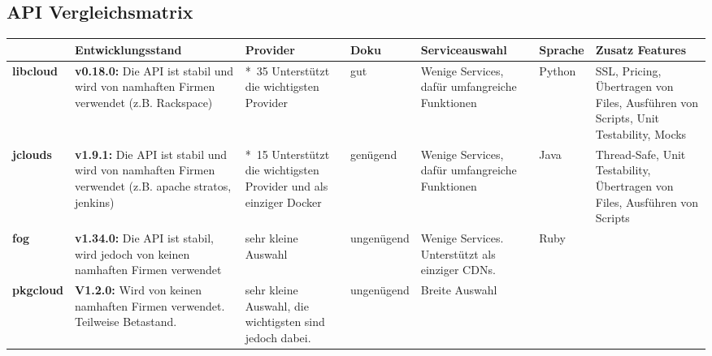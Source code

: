 
\begin{landscape}
  \subsection{API Vergleichsmatrix}
  \label{API Vergleichsmatrix}
\begin{table}[h]  
  \begin{tabularx}{\linewidth}{|l|X|X|l|X|l|X|}
    \hline
    &
    \textbf{Entwicklungsstand}
    &
    \textbf{Provider}
    &
    \textbf{Doku}
    &
    \textbf{Serviceauswahl}
    &
    \textbf{Sprache}
    &
    \textbf{Zusatz Features}
   \\
  \hline
  \textbf{libcloud} & \cellcolor{green!25} \textbf{v0.18.0:} 
  Die API ist stabil und wird von namhaften Firmen verwendet 
  (z.B. Rackspace)
  & 
  \cellcolor{green!25}
  *~35 Unterstützt die wichtigsten Provider
  & 
   \cellcolor{green!25}
   gut
  & 
   \cellcolor{green!25}
  Wenige Services, dafür umfangreiche Funktionen
  & 
     \cellcolor{yellow!25}
  Python
  & 
  \cellcolor{green!25}
  SSL, Pricing, Übertragen von Files, Ausführen von Scripts, Unit Testability, Mocks
  \\
  \hline
 \textbf{jclouds}
& 
\cellcolor{green!25} 
\textbf{v1.9.1:} Die API ist stabil und wird von namhaften 
Firmen verwendet (z.B. apache stratos, jenkins)
&	
\cellcolor{green!25}
*~15
Unterstützt die wichtigsten Provider und als einziger Docker
&
\cellcolor{yellow!25}
genügend
&
\cellcolor{green!25}
Wenige Services, dafür umfangreiche Funktionen	
&
\cellcolor{green!25}
Java	
&
\cellcolor{green!25}
Thread-Safe, Unit Testability, Übertragen von Files, Ausführen von Scripts
 \\
 \hline
 \textbf{fog}
 &
 \cellcolor{yellow!25}	
 \textbf{v1.34.0:} 
 Die API ist stabil, wird jedoch von keinen namhaften Firmen verwendet
 &
 \cellcolor{red!50}
 sehr kleine Auswahl
 &
  \cellcolor{red!50}	
ungenügend	
&
 \cellcolor{red!50}
Wenige Services. Unterstützt als einziger CDNs.	
&
 \cellcolor{red!50}
Ruby
&
 \cellcolor{red!50}
\\
\hline
\textbf{pkgcloud}
&
 \cellcolor{yellow!25}	
\textbf{V1.2.0:} Wird von keinen namhaften Firmen verwendet. Teilweise Betastand.
&
\cellcolor{green!25}
sehr kleine Auswahl, die wichtigsten sind jedoch dabei.
&
\cellcolor{red!50}
ungenügend	
&
\cellcolor{green!25}
Breite Auswahl
&
 \cellcolor{yellow!25}	

\end{tabularx}
\end{table}
\end{landscape}
